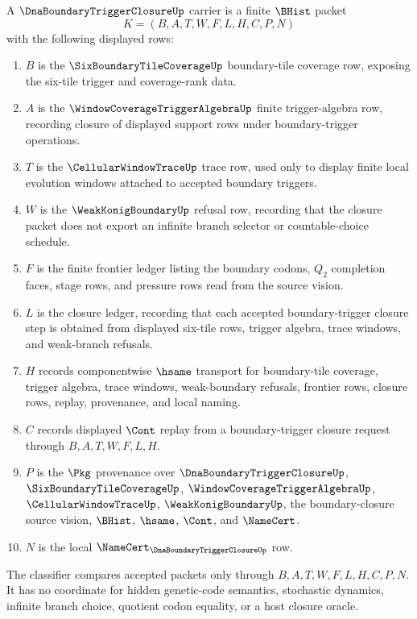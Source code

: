 \begin{definition}
\label{def:dna-boundary-trigger-closure-carrier}
A $\DnaBoundaryTriggerClosureUp$ carrier is a finite $\BHist$ packet
$$
K=(B,A,T,W,F,L,H,C,P,N)
$$
with the following displayed rows:
\begin{enumerate}
\item $B$ is the $\SixBoundaryTileCoverageUp$ boundary-tile coverage row, exposing the six-tile trigger and coverage-rank data.
\item $A$ is the $\WindowCoverageTriggerAlgebraUp$ finite trigger-algebra row, recording closure of displayed support rows under boundary-trigger operations.
\item $T$ is the $\CellularWindowTraceUp$ trace row, used only to display finite local evolution windows attached to accepted boundary triggers.
\item $W$ is the $\WeakKonigBoundaryUp$ refusal row, recording that the closure packet does not export an infinite branch selector or countable-choice schedule.
\item $F$ is the finite frontier ledger listing the boundary codons, $Q_{2}$ completion faces, stage rows, and pressure rows read from the source vision.
\item $L$ is the closure ledger, recording that each accepted boundary-trigger closure step is obtained from displayed six-tile rows, trigger algebra, trace windows, and weak-branch refusals.
\item $H$ records componentwise $\hsame$ transport for boundary-tile coverage, trigger algebra, trace windows, weak-boundary refusals, frontier rows, closure rows, replay, provenance, and local naming.
\item $C$ records displayed $\Cont$ replay from a boundary-trigger closure request through $B,A,T,W,F,L,H$.
\item $P$ is the $\Pkg$ provenance over $\DnaBoundaryTriggerClosureUp$, $\SixBoundaryTileCoverageUp$, $\WindowCoverageTriggerAlgebraUp$, $\CellularWindowTraceUp$, $\WeakKonigBoundaryUp$, the boundary-closure source vision, $\BHist$, $\hsame$, $\Cont$, and $\NameCert$.
\item $N$ is the local $\NameCert_{\DnaBoundaryTriggerClosureUp}$ row.
\end{enumerate}
The classifier compares accepted packets only through $B,A,T,W,F,L,H,C,P,N$. It has no coordinate for hidden genetic-code semantics, stochastic dynamics, infinite branch choice, quotient codon equality, or a host closure oracle.
\end{definition}

